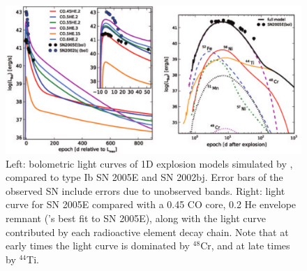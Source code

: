 


\begin{figure}
\centerline{\includegraphics[width=1.0\hsize]{waldmanfigure.pdf}}
\caption{Left: bolometric light curves of 1D explosion models simulated by \citeauthor{wald+10}, compared to type Ib SN 2005E and SN 2002bj.  Error bars of the observed SN include errors due to unobserved bands.  Right: light curve for SN 2005E compared with a 0.45 {\Msun} CO core, 0.2 {\Msun} He envelope remnant (\citeauthor{wald+10}'s best fit to SN 2005E), along with the light curve contributed by each radioactive element decay chain.  Note that at early times the light curve is dominated by $^{48}$Cr, and at late times by $^{44}$Ti.}
\label{waldmanfigure}
\end{figure}

